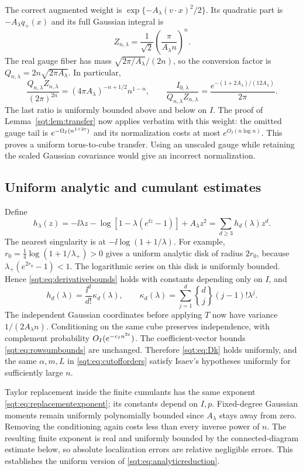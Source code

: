 The correct augmented weight is $\exp\{-A_\lambda(v\cdot x)^2/2\}$. Its quadratic part is $-A_\lambda q_+(x)$ and its full Gaussian integral is
\[
Z_{n,\lambda}=\frac1{\sqrt2}\left(\frac\pi{A_\lambda n}\right)^n.
\]
The real gauge fiber has mass $\sqrt{2\pi/A_\lambda}/(2n)$, so the conversion factor is $Q_{n,\lambda}=2n\sqrt{2\pi A_\lambda}$. In particular,
\[
\frac{Q_{n,\lambda}Z_{n,\lambda}}{(2\pi)^{2n}}
 =(4\pi A_\lambda)^{-n+1/2}n^{1-n},\qquad
\frac{I_{0,\lambda}}{Q_{n,\lambda}Z_{n,\lambda}}
 =\frac{e^{-(1+2A_\lambda)/(12A_\lambda)}}{2\pi}.
\]
The last ratio is uniformly bounded above and below on $I$. The proof of Lemma~\ref{sqt:lem:transfer} now applies verbatim with this weight: the omitted gauge tail is $e^{-\Omega_I(n^{1+2\varepsilon})}$ and its normalization costs at most $e^{O_I(n\log n)}$. This proves a uniform torus-to-cube transfer. Using an unscaled gauge while retaining the scaled Gaussian covariance would give an incorrect normalization.

\subsection{Uniform analytic and cumulant estimates}
Define
\[
h_\lambda(z)=-\ii\lambda z-\log[1-\lambda(e^{\ii z}-1)]+A_\lambda z^2
 =\sum_{d\geq3}h_d(\lambda)z^d.
\]
The nearest singularity is at $-\ii\log(1+1/\lambda)$. For example, $r_0=\tfrac14\log(1+1/\lambda_+)>0$ gives a uniform analytic disk of radius $2r_0$, because
$\lambda_+(e^{2r_0}-1)<1$. The logarithmic series on this disk is uniformly bounded. Hence \eqref{sqt:eq:derivativebounds} holds with constants depending only on $I$, and
\begin{equation}\label{sqt:eq:densitycumulants}
h_d(\lambda)=\frac{\ii^d}{d!}\kappa_d(\lambda),\qquad
\kappa_d(\lambda)=\sum_{j=1}^d\genfrac{\{}{\}}{0pt}{}{d}{j}(j-1)!\lambda^j.
\end{equation}
The independent Gaussian coordinates before applying $T$ now have variance $1/(2A_\lambda n)$. Conditioning on the same cube preserves independence, with complement probability $O_I(e^{-c_I n^{2\varepsilon}})$. The coefficient-vector bounds \eqref{sqt:eq:rowsumbounds} are unchanged. Therefore \eqref{sqt:eq:Dk} holds uniformly, and the same $\alpha,m,L$ in \eqref{sqt:eq:cutofforders} satisfy Isaev's hypotheses uniformly for sufficiently large $n$.

Taylor replacement inside the finite cumulants has the same exponent \eqref{sqt:eq:replacementexponent}; its constants depend on $I,p$. Fixed-degree Gaussian moments remain uniformly polynomially bounded since $A_\lambda$ stays away from zero. Removing the conditioning again costs less than every inverse power of $n$. The resulting finite exponent is real and uniformly bounded by the connected-diagram estimate below, so absolute localization errors are relative negligible errors. This establishes the uniform version of \eqref{sqt:eq:analyticreduction}.

